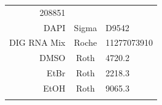 \documentclass[11pt,singlespacinge,twoside]{reedthesis} %
\theoremstyle{definition}
\theoremstyle{definition}
\theoremstyle{definition}
\theoremstyle{remark}
\begin{document}
\begin{longtable}[]{@{}rcl@{}}
\begin{minipage}[t]{0.29\columnwidth}
208851\strut
\end{minipage}\tabularnewline
\begin{minipage}[t]{0.29\columnwidth}\raggedleft
DAPI\strut
\end{minipage} & \begin{minipage}[t]{0.33\columnwidth}\centering
Sigma\strut
\end{minipage} & \begin{minipage}[t]{0.29\columnwidth}\raggedright
D9542\strut
\end{minipage}\tabularnewline
\begin{minipage}[t]{0.29\columnwidth}\raggedleft
DIG RNA Mix\strut
\end{minipage} & \begin{minipage}[t]{0.33\columnwidth}\centering
Roche\strut
\end{minipage} & \begin{minipage}[t]{0.29\columnwidth}\raggedright
11277073910\strut
\end{minipage}\tabularnewline
\begin{minipage}[t]{0.29\columnwidth}\raggedleft
DMSO\strut
\end{minipage} & \begin{minipage}[t]{0.33\columnwidth}\centering
Roth\strut
\end{minipage} & \begin{minipage}[t]{0.29\columnwidth}\raggedright
4720.2\strut
\end{minipage}\tabularnewline
\begin{minipage}[t]{0.29\columnwidth}\raggedleft
EtBr\strut
\end{minipage} & \begin{minipage}[t]{0.33\columnwidth}\centering
Roth\strut
\end{minipage} & \begin{minipage}[t]{0.29\columnwidth}\raggedright
2218.3\strut
\end{minipage}\tabularnewline
\begin{minipage}[t]{0.29\columnwidth}\raggedleft
EtOH\strut
\end{minipage} & \begin{minipage}[t]{0.33\columnwidth}\centering
Roth\strut
\end{minipage} & \begin{minipage}[t]{0.29\columnwidth}\raggedright
9065.3\strut
\end{minipage}\tabularnewline
\begin{minipage}[t]{0.29\columnwidth}\raggedleft

\end{minipage}
\end{longtable}
\end{document}

